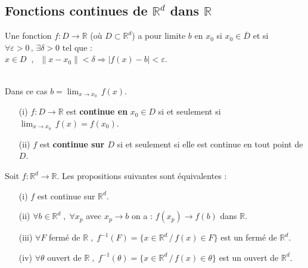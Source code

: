 \documentclass[class=report,crop=false]{standalone}
\begin{document}
\subsection{Fonctions  continues de $\mathbb{R}^d$ dans $\mathbb{R}$}






\begin{definition}
Une fonction $f : D \rightarrow \mathbb{R}$ (o\`u $D \subset \mathbb{R}^d$) a pour limite $b$ en $x_{0}$ si $x_{0} \in \overline{D}$ et si $\forall \varepsilon > 0\,,\, \exists \delta > 0$ tel que :\\
$x \in D \;\;,\;\;\|x - x_{0}\| < \delta \Rightarrow |f(x) - b| < \varepsilon$.
\end{definition}


\\
Dans ce cas $b = \displaystyle \lim_{x \rightarrow x_{0}}\, f(x)$.


\begin{definition}
\begin{enumerate}
\item[(i)] $f : D \rightarrow \mathbb{R}$ est {\bf continue en} $x_{0} \in D$ si et seulement si $\displaystyle \lim_{x \rightarrow x_{0}}\, f(x) = f(x_{0})$.
\item[(ii)] $f$ est {\bf continue sur $D$} si et seulement si elle est continue en tout point de $D$.
\end{enumerate}
\end{definition}


\begin{theoreme}
Soit $f : \mathbb{R}^d \rightarrow \mathbb{R}$.
Les propositions suivantes sont équivalentes :
\begin{enumerate}
\item[(i)] $f$ est continue sur $ \mathbb{R}^d$.
\item[(ii)] $\forall b \in  \mathbb{R}^d \;,\; \forall x_{p}$ avec $x_{p} \rightarrow b$ on a : $f(x_{p}) \rightarrow f(b)$ dans $\mathbb{R}$.
\item[(iii)] $\forall F$ fermé de $\mathbb{R}\;,\; f^{-1}(F) = \lbrace x \in  \mathbb{R}^d \,/\,f(x) \in F \rbrace$ est un fermé de $\mathbb{R}^d$.
\item[(iv)] $\forall\theta$ ouvert de $\mathbb{R}\;,\; f^{-1}(\theta) = \lbrace x \in  \mathbb{R}^d \,/\,f(x) \in \theta \rbrace$ est un ouvert de $\mathbb{R}^d$.
\end{enumerate}
\end{theoreme}
\end{document}
